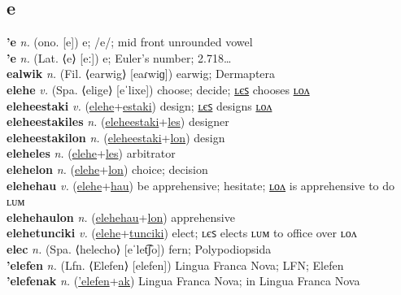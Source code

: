 \subsection{e}

\textbf{'e} \textit{n.} (ono. [e])
e; /e/; mid front unrounded vowel \label{'e} \\
\textbf{'e} \textit{n.} (Lat. ⟨e⟩ [eː])
e; Euler’s number; 2.718… \label{'e} \\
\textbf{ealwik} \textit{n.} (Fil. ⟨earwig⟩ [eaɾwiɡ])
earwig; Dermaptera \label{ealwik} \\
\textbf{elehe} \textit{v.} (Spa. ⟨elige⟩ [eˈlixe])
choose; decide; \hyperref[eleheles]{ʟєꜱ} chooses \hyperref[elehelon]{ʟᴏᴧ} \label{elehe} \\
\textbf{eleheestaki} \textit{v.} (\hyperref[elehe]{elehe}+\hyperref[estaki]{estaki})
design; \hyperref[eleheestakiles]{ʟєꜱ} designs \hyperref[eleheestakilon]{ʟᴏᴧ} \label{eleheestaki} \\
\textbf{eleheestakiles} \textit{n.} (\hyperref[eleheestaki]{eleheestaki}+\hyperref[les]{les})
designer \label{eleheestakiles} \\
\textbf{eleheestakilon} \textit{n.} (\hyperref[eleheestaki]{eleheestaki}+\hyperref[lon]{lon})
design \label{eleheestakilon} \\
\textbf{eleheles} \textit{n.} (\hyperref[elehe]{elehe}+\hyperref[les]{les})
arbitrator \label{eleheles} \\
\textbf{elehelon} \textit{n.} (\hyperref[elehe]{elehe}+\hyperref[lon]{lon})
choice; decision \label{elehelon} \\
\textbf{elehehau} \textit{v.} (\hyperref[elehe]{elehe}+\hyperref[hau]{hau})
be apprehensive; hesitate; \hyperref[elehehaulon]{ʟᴏᴧ} is apprehensive to do ʟᴜᴍ \label{elehehau} \\
\textbf{elehehaulon} \textit{n.} (\hyperref[elehehau]{elehehau}+\hyperref[lon]{lon})
apprehensive \label{elehehaulon} \\
\textbf{elehetunciki} \textit{v.} (\hyperref[elehe]{elehe}+\hyperref[tunciki]{tunciki})
elect; ʟєꜱ elects ʟᴜᴍ to office over ʟᴏᴧ \label{elehetunciki} \\
\textbf{elec} \textit{n.} (Spa. ⟨helecho⟩ [eˈlet͡ʃo])
fern; Polypodiopsida \label{elec} \\
\textbf{'elefen} \textit{n.} (Lfn. ⟨Elefen⟩ [elefen])
Lingua Franca Nova; LFN; Elefen \label{'elefen} \\
\textbf{'elefenak} \textit{n.} (\hyperref['elefen]{'elefen}+\hyperref[ak]{ak})
Lingua Franca Nova; in Lingua Franca Nova \label{'elefenak} \\
